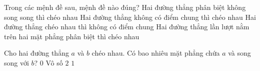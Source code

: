 \begin{ex}%
	Trong các mệnh đề sau, mệnh đề nào đúng?
	\choice
	{Hai đường thẳng phân biệt không song song thì chéo nhau}
	{Hai đường thẳng không có điểm chung thì chéo nhau}
	{\True Hai đường thẳng chéo nhau thì không có điểm chung}
	{Hai đường thẳng lần lượt nằm trên hai mặt phẳng phân biệt thì chéo nhau}
\end{ex}

\begin{ex}%
	Cho hai đường thẳng $a$ và $b$ chéo nhau. Có bao nhiêu mặt phẳng chứa $a$ và song song với $b$?
	\choice
	{$0$}
	{Vô số}
	{$2$}
	{\True $1$}
\end{ex}

